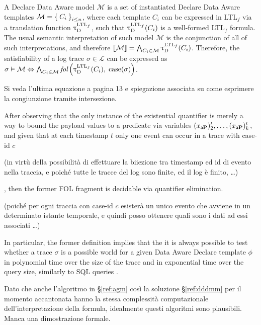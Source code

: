 {\color{blue}A Declare Data Aware model $\mathcal{M}$ is a set of instantiated Declare Data Aware templates $\mathcal{M}=\Set{C_i}_{i\leq n}$, where each template $C_i$ can be expressed in LTL$_f$ via a translation function $\uptau_{\textup{D}}^{\textup{LTL}_f}$, such that $\uptau_{\textup{D}}^{\textup{LTL}_f}(C_i)$ is a well-formed LTL$_f$ formula. The usual semantic interpretation of such model $\mathcal{M}$ is the conjunction of all of such interpretations, and therefore $\llbracket \mathcal{M} \rrbracket=\bigwedge_{C_i\in\mathcal{M}}\uptau_{\textup{D}}^{\textup{LTL}_f}(C_i)$. Therefore, the satisfiability of a log trace $\sigma\in\mathcal{L}$ can be expressed as $\sigma\vDash\mathcal{M}\Leftrightarrow \bigwedge_{C_i\in\mathcal{M}}\textit{fol}\left(\uptau_{\textup{D}}^{\textup{LTL}_f}(C_i),\;\textup{case}(\sigma)\right)$.}
\begin{UnknownEnvironment}
	\color{red} Si veda l'ultima equazione a pagina 13 e spiegazione associata su come esprimere la congiunzione tramite intersezione.
\end{UnknownEnvironment}
After observing that the only instance of the existential quantifier is merely a way to bound the payload values to a predicate via variables $({x_{\mathsf{a}\mathbf{P}}})_2^t,\dots,({x_{\mathsf{a}\mathbf{P}}})_k^t$, and given that at each timestamp $t$ only one event can occur in a trace with case-id $c$
\begin{UnknownEnvironment}
	\color{red} (in virtù della possibilità di effettuare la biiezione tra timestamp ed id di evento nella traccia, e poiché tutte le tracce del log sono finite, ed il log è finito, \dots)
\end{UnknownEnvironment}
, then the former FOL fragment is decidable via quantifier elimination. 
\begin{UnknownEnvironment}
	\color{red} (poiché per ogni traccia con case-id $c$ esisterà un unico evento che avviene in un determinato istante temporale, e quindi posso ottenere quali sono i dati ad essi associati \dots)
\end{UnknownEnvironment}In particular, the former definition implies that the it is always possible to test whether a trace $\sigma$ is a {\color{blue}possible world} for a given Data Aware Declare template $\phi$ in polynomial time over the size of the trace and in exponential time over the query size, similarly to SQL queries \cite{DBLP:conf/stoc/Vardi82}. 
\begin{UnknownEnvironment}
	\color{red} Dato che anche l'algoritmo in \S\ref{ref:agm} così la soluzione \S\ref{ref:dddmm} per il momento accantonata hanno la stessa complessità computazionale dell'interpretazione della formula, idealmente questi algoritmi sono plausibili. Manca una dimostrazione formale.
\end{UnknownEnvironment}



